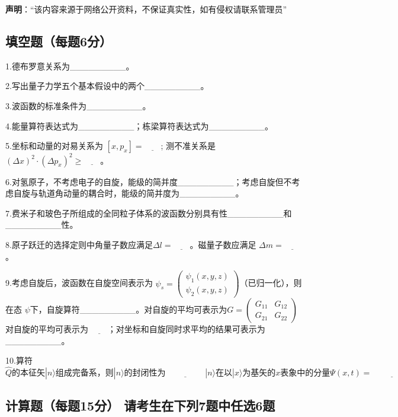 
\textbf{声明}：“该内容来源于网络公开资料，不保证真实性，如有侵权请联系管理员”

\subsection{填空题（每题6分）}

1.德布罗意关系为_________。

2.写出量子力学五个基本假设中的两个_________。

3.波函数的标准条件为_________。

4.能量算符表达式为_________；栋梁算符表达式为_________。

5.坐标和动量的对易关系为 $[x, p_x] = \underline{\quad\quad}$;
          测不准关系是 $(\Delta x)^2 \cdot (\Delta p_x)^2 \geq \underline{\quad\quad}$。

6.对氢原子，不考虑电子的自旋，能级的简并度_________；考虑自旋但不考虑自旋与轨道角动量的耦合时，能级的简并度为_________。

7.费米子和玻色子所组成的全同粒子体系的波函数分别具有性_________和_________性。

8.原子跃迁的选择定则中角量子数应满足$\Delta l = \underline{\quad\quad}$。磁量子数应满足 $\Delta m = \underline{\quad\quad}$。

9.考虑自旋后，波函数在自旋空间表示为 $\psi_s = \begin{pmatrix} \psi_1(x, y, z) \\ \psi_2(x, y, z) \end{pmatrix}$（已归一化），则在态 $\psi$下，自旋算符_________。对自旋的平均可表示为$G = \begin{pmatrix} G_{11} & G_{12} \\ G_{21} & G_{22} \end{pmatrix}$ 对自旋的平均可表示为 $\underline{\quad\quad}$；对坐标和自旋同时求平均的结果可表示为_________。

10.算符$\hat{Q}\text{的本征矢}|n\rangle \text{组成完备系，则}|n\rangle \text{的封闭性为} \underline{\hspace{2cm}}
|n\rangle \text{在以}|x\rangle \text{为基矢的} x \text{表象中的分量}\Psi(x,t)=\underline{\hspace{2cm}}$

\subsection{计算题（每题15分） 请考生在下列7题中任选6题}

